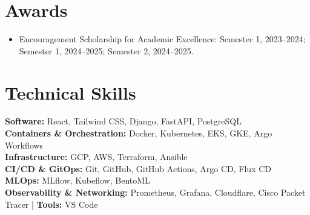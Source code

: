 \documentclass[letterpaper,11pt]{article}
\begin{document}
\section{Awards}
\begin{itemize}[leftmargin=0.15in]
  \small
  \item Encouragement Scholarship for Academic Excellence: Semester 1, 2023--2024; Semester 1, 2024--2025; Semester 2, 2024--2025.
\end{itemize}

\section{Technical Skills}
\begin{itemize}[leftmargin=0.15in, label={}]
  \small{\item{
    \textbf{Software:} React, Tailwind CSS, Django, FastAPI, PostgreSQL \\
    \textbf{Containers \& Orchestration:} Docker, Kubernetes, EKS, GKE, Argo Workflows \\
    \textbf{Infrastructure:} GCP, AWS, Terraform, Ansible \\
    \textbf{CI/CD \& GitOps:} Git, GitHub, GitHub Actions, Argo CD, Flux CD \\
    \textbf{MLOps:} MLflow, Kubeflow, BentoML \\
    \textbf{Observability \& Networking:} Prometheus, Grafana, Cloudflare, Cisco Packet Tracer \quad | \quad
    \textbf{Tools:} VS Code
  }}
\end{itemize}
\end{document}
